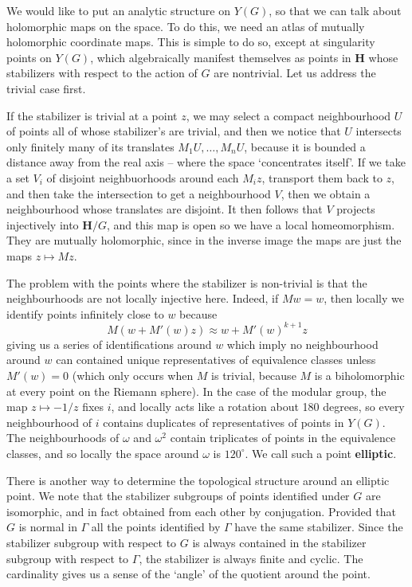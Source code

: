 We would like to put an analytic structure on $Y(G)$, so that we can talk about holomorphic maps on the space. To do this, we need an atlas of mutually holomorphic coordinate maps. This is simple to do so, except at singularity points on $Y(G)$, which algebraically manifest themselves as points in $\mathbf{H}$ whose stabilizers with respect to the action of $G$ are nontrivial. Let us address the trivial case first.

If the stabilizer is trivial at a point $z$, we may select a compact neighbourhood $U$ of points all of whose stabilizer's are trivial, and then we notice that $U$ intersects only finitely many of its translates $M_1U ,\dots, M_nU$, because it is bounded a distance away from the real axis -- where the space `concentrates itself'. If we take a set $V_i$ of disjoint neighbuorhoods around each $M_iz$, transport them back to $z$, and then take the intersection to get a neighbourhood $V$, then we obtain a neighbourhood whose translates are disjoint. It then follows that $V$ projects injectively into $\mathbf{H}/G$, and this map is open so we have a local homeomorphism. They are mutually holomorphic, since in the inverse image the maps are just the maps $z \mapsto Mz$.

The problem with the points where the stabilizer is non-trivial is that the neighbourhoods are not locally injective here. Indeed, if $Mw = w$, then locally we identify points infinitely close to $w$ because
%
\[ M(w + M'(w)z) \approx w + M'(w)^{k+1}z \]
%
giving us a series of identifications around $w$ which imply no neighbourhood around $w$ can contained unique representatives of equivalence classes unless $M'(w) = 0$ (which only occurs when $M$ is trivial, because $M$ is a biholomorphic at every point on the Riemann sphere). In the case of the modular group, the map $z \mapsto -1/z$ fixes $i$, and locally acts like a rotation about 180 degrees, so every neighbourhood of $i$ contains duplicates of representatives of points in $Y(G)$. The neighbourhoods of $\omega$ and $\omega^2$ contain triplicates of points in the equivalence classes, and so locally the space around $\omega$ is $120^\circ$. We call such a point {\bf elliptic}.

There is another way to determine the topological structure around an elliptic point. We note that the stabilizer subgroups of points identified under $G$ are isomorphic, and in fact obtained from each other by conjugation. Provided that $G$ is normal in $\Gamma$ all the points identified by $\Gamma$ have the same stabilizer. Since the stabilizer subgroup with respect to $G$ is always contained in the stabilizer subgroup with respect to $\Gamma$, the stabilizer is always finite and cyclic. The cardinality gives us a sense of the `angle' of the quotient around the point.


